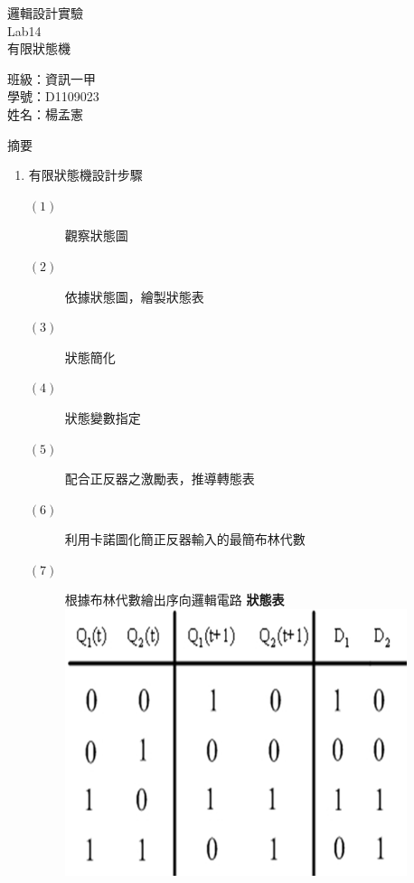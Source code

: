 \documentclass[12pt, a4paper]{article}
\begin{document}
\begin{center}
  {\Huge 邏輯設計實驗} \\[2.5cm]
  {\Huge Lab14} \\[1.5cm]
  {\Huge 有限狀態機} \\ [4.5cm]
  \hspace{.6in}
  \begin{minipage}[t]{.4\linewidth}
    {\Large 班級：資訊一甲}\\[0.5cm]
    {\Large 學號：D1109023}\\[0.5cm]
    {\Large 姓名：楊孟憲}
  \end{minipage}    
\end{center}

\newpage

\begin{description}
  \fontsize{22pt}{25pt}\selectfont 
    \item [一、]摘要 
      \begin{enumerate}
        \fontsize{20pt}{22pt}\selectfont
          \item 有限狀態機設計步驟 
            \fontsize{16pt}{20}\selectfont
              \begin{description}
                \item [$(1)$] 觀察狀態圖
                \item [$(2)$] 依據狀態圖，繪製狀態表 
                \item [$(3)$] 狀態簡化
                \item [$(4)$] 狀態變數指定
                \item [$(5)$] 配合正反器之激勵表，推導轉態表
                \item [$(6)$] 利用卡諾圖化簡正反器輸入的最簡布林代數
                \item [$(7)$] 根據布林代數繪出序向邏輯電路
                \bf 狀態表
                \includegraphics[width=10cm]{./image/designed-the-kmap.png}
              \end{description}


\end{enumerate}
\end{description}
\end{document}
